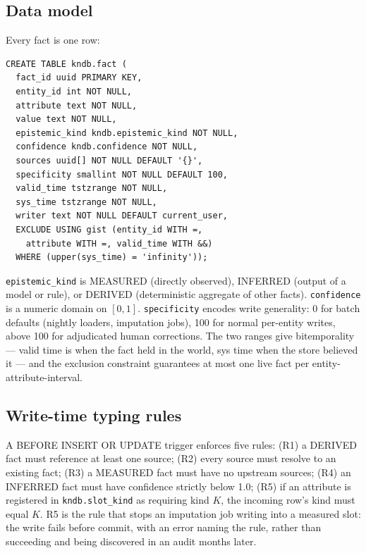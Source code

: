 \documentclass[sigconf,nonacm]{acmart}
\begin{document}
\subsection{Data model}
Every fact is one row:
{\small\begin{verbatim}
CREATE TABLE kndb.fact (
  fact_id uuid PRIMARY KEY,
  entity_id int NOT NULL,
  attribute text NOT NULL,
  value text NOT NULL,
  epistemic_kind kndb.epistemic_kind NOT NULL,
  confidence kndb.confidence NOT NULL,
  sources uuid[] NOT NULL DEFAULT '{}',
  specificity smallint NOT NULL DEFAULT 100,
  valid_time tstzrange NOT NULL,
  sys_time tstzrange NOT NULL,
  writer text NOT NULL DEFAULT current_user,
  EXCLUDE USING gist (entity_id WITH =,
    attribute WITH =, valid_time WITH &&)
  WHERE (upper(sys_time) = 'infinity'));
\end{verbatim}}
\noindent \texttt{epistemic\_kind} is MEASURED (directly observed), INFERRED (output of a model or rule), or DERIVED (deterministic aggregate of other facts). \texttt{confidence} is a numeric domain on $[0,1]$. \texttt{specificity} encodes write generality: 0 for batch defaults (nightly loaders, imputation jobs), 100 for normal per-entity writes, above 100 for adjudicated human corrections. The two ranges give bitemporality --- valid time is when the fact held in the world, sys time when the store believed it --- and the exclusion constraint guarantees at most one live fact per entity-attribute-interval.

\subsection{Write-time typing rules}
A BEFORE INSERT OR UPDATE trigger enforces five rules: (R1) a DERIVED fact must reference at least one source; (R2) every source must resolve to an existing fact; (R3) a MEASURED fact must have no upstream sources; (R4) an INFERRED fact must have confidence strictly below 1.0; (R5) if an attribute is registered in \texttt{kndb.slot\_kind} as requiring kind $K$, the incoming row's kind must equal $K$. R5 is the rule that stops an imputation job writing into a measured slot: the write fails before commit, with an error naming the rule, rather than succeeding and being discovered in an audit months later.
\end{document}
